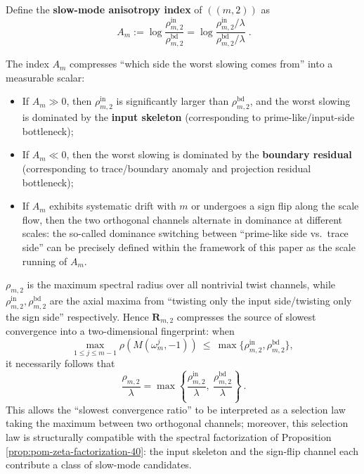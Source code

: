 \begin{definition}\label{def:rho-m2-anisotropy-index}
Define the \textbf{slow-mode anisotropy index} of \(((m,2))\) as
\[
\boxed{\;
A_m
:=\log\frac{\rho^{\mathrm{in}}_{m,2}}{\rho^{\mathrm{bd}}_{m,2}}
=\log\frac{\rho^{\mathrm{in}}_{m,2}/\lambda}{\rho^{\mathrm{bd}}_{m,2}/\lambda}\; }.
\]
\end{definition}

\begin{remark}\label{rem:rho-m2-anisotropy-classifier}
The index \(A_m\) compresses ``which side the worst slowing comes from'' into a measurable scalar:
\begin{itemize}
  \item If \(A_m\gg 0\), then \(\rho^{\mathrm{in}}_{m,2}\) is significantly larger than \(\rho^{\mathrm{bd}}_{m,2}\), and the worst slowing is dominated by the \textbf{input skeleton} (corresponding to prime-like/input-side bottleneck);
  \item If \(A_m\ll 0\), then the worst slowing is dominated by the \textbf{boundary residual} (corresponding to trace/boundary anomaly and projection residual bottleneck);
  \item If \(A_m\) exhibits systematic drift with \(m\) or undergoes a sign flip along the scale flow, then the two orthogonal channels alternate in dominance at different scales: the so-called dominance switching between ``prime-like side vs.\ trace side'' can be precisely defined within the framework of this paper as the scale running of \(A_m\).
\end{itemize}
\end{remark}

\begin{remark}\label{rem:rho-m2-competition-law}
\(\rho_{m,2}\) is the maximum spectral radius over all nontrivial twist channels, while \(\rho^{\mathrm{in}}_{m,2},\rho^{\mathrm{bd}}_{m,2}\) are the axial maxima from ``twisting only the input side/twisting only the sign side'' respectively.
Hence \(\mathbf{R}_{m,2}\) compresses the source of slowest convergence into a two-dimensional fingerprint: when
\[
\max_{1\le j\le m-1}\rho\!\left(M(\omega_m^{j},-1)\right)\ \le\ \max\{\rho^{\mathrm{in}}_{m,2},\rho^{\mathrm{bd}}_{m,2}\},
\]
it necessarily follows that
\[
\boxed{\ \frac{\rho_{m,2}}{\lambda}=\max\left\{\frac{\rho^{\mathrm{in}}_{m,2}}{\lambda},\ \frac{\rho^{\mathrm{bd}}_{m,2}}{\lambda}\right\}\ }.
\]
This allows the ``slowest convergence ratio'' to be interpreted as a selection law taking the maximum between two orthogonal channels; moreover, this selection law is structurally compatible with the spectral factorization of Proposition \ref{prop:pom-zeta-factorization-40}: the input skeleton and the sign-flip channel each contribute a class of slow-mode candidates.
\end{remark}

